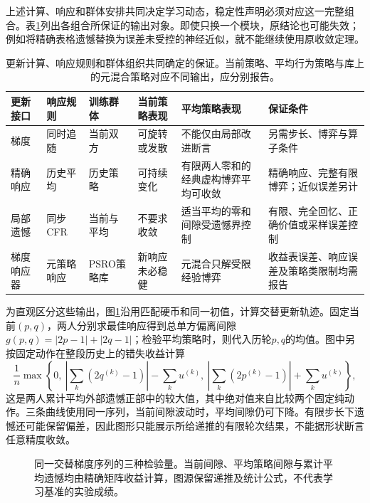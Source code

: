 上述计算、响应和群体安排共同决定学习动态，稳定性声明必须对应这一完整组合。表\ref{tab:rl-multi-agent-dynamics}列出各组合所保证的输出对象。即使只换一个模块，原结论也可能失效；例如将精确表格遗憾替换为误差未受控的神经近似，就不能继续使用原收敛定理。

\begin{table}[htbp]
 \centering
 \begin{tabularx}{\linewidth}{@{}l l l >{\raggedright\arraybackslash}X >{\raggedright\arraybackslash}X >{\raggedright\arraybackslash}X@{}}
 \toprule
 更新接口 & 响应规则 & 训练群体 & 当前策略表现 & 平均策略表现 & 保证条件\\
 \midrule
 梯度 & 同时追随 & 当前双方 & 可旋转或发散 & 不能仅由局部改进断言 & 另需步长、博弈与算子条件\\
 精确响应 & 历史平均 & 历史策略 & 可持续变化 & 有限两人零和的经典虚构博弈平均可收敛 & 精确响应、完整有限博弈；近似误差另计\\
 局部遗憾 & 同步CFR & 当前与平均 & 不要求收敛 & 适当平均的零和间隙受遗憾界控制 & 有限、完全回忆、正确价值或采样误差控制\\
 梯度响应器 & 元策略响应 & PSRO策略库 & 新响应未必稳健 & 元混合只解受限经验博弈 & 收益表误差、响应误差及策略类限制均需报告\\
 \bottomrule
 \end{tabularx}
 \caption{更新计算、响应规则和群体组织共同确定的保证。当前策略、平均行为策略与库上的元混合策略对应不同输出，应分别报告。}
 \label{tab:rl-multi-agent-dynamics}
\end{table}

为直观区分这些输出，图\ref{fig:rl-multi-agent-stability}沿用匹配硬币和同一初值，计算交替更新轨迹。固定当前$(p,q)$，两人分别求最佳响应得到总单方偏离间隙
$g(p,q)=|2p-1|+|2q-1|$；检验平均策略时，则代入历轮$p,q$的均值。图中另按固定动作在整段历史上的错失收益计算
\[
 \frac1n\max\!\left\{0,\
 \left|\sum_k(2q^{(k)}-1)\right|-\sum_k u^{(k)},\
 \left|\sum_k(2p^{(k)}-1)\right|+\sum_k u^{(k)}\right\},
\]
这是两人累计平均外部遗憾正部中的较大值，其中绝对值来自比较两个固定纯动作。三条曲线使用同一序列，当前间隙波动时，平均间隙仍可下降。有限步长下遗憾还可能保留偏差，因此图形只能展示所给递推的有限轮次结果，不能据形状断言任意精度收敛。

\begin{figure}[htbp]
 \centering
 
 \caption{同一交替梯度序列的三种检验量。当前间隙、平均策略间隙与累计平均遗憾均由精确矩阵收益计算，图源保留递推及统计公式，不代表学习基准的实验成绩。}
 \label{fig:rl-multi-agent-stability}
\end{figure}

